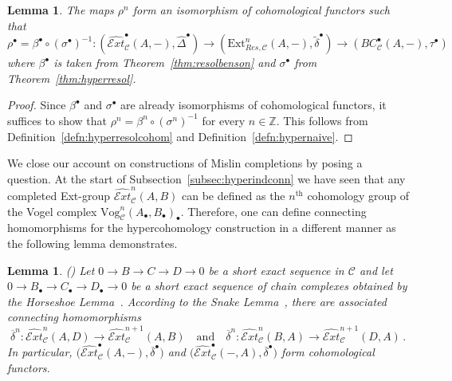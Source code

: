 \documentclass[12pt,a4paper]{article}
\numberwithin{equation}{section}
\newtheorem{lem}[thm]{Lemma}
\theoremstyle{nonumberplain}
\newtheorem{proof}{Proof}
\begin{document}
\begin{lem}\label{lem:hypernaive}
The maps $\rho^n$ form an isomorphism of cohomological functors such that
\[ \rho^{\bullet} = \beta^{\bullet} \circ (\sigma^{\bullet})^{-1}: (\widehat{\mathcal{E}xt}_{\mathcal{C}}^{\bullet}(A, -), \widehat{\Delta}^{\bullet}) \rightarrow (\mathrm{Ext}_{Res, \mathcal{C}}^n(A, -), \widetilde{\delta}^{\bullet}) \rightarrow (BC_{\mathcal{C}}^{\bullet}(A, -), \tau^{\bullet}) \]
where $\beta^{\bullet}$ is taken from Theorem~\ref{thm:resolbenson} and $\sigma^{\bullet}$ from Theorem~\ref{thm:hyperresol}.
\end{lem}

\begin{proof}
Since $\beta^{\bullet}$ and $\sigma^{\bullet}$ are already isomorphisms of cohomological functors, it suffices to show that $\rho^n = \beta^n \circ (\sigma^{n})^{-1}$ for every $n \in \mathbb{Z}$. This follows from Definition~\ref{defn:hyperresolcohom} and Definition~\ref{defn:hypernaive}.
\end{proof}

We close our account on constructions of Mislin completions by posing a question. At the start of Subsection~\ref{subsec:hyperindconn} we have seen that any completed Ext-group $\widehat{\mathcal{E}xt}_{\mathcal{C}}^n(A, B)$ can be defined as the $n^{\text{th}}$ cohomology group of the Vogel complex $\mathrm{Vog}_{\mathcal{C}}^n(A_{\bullet}, B_{\bullet})_{\bullet}$. Therefore, one can define connecting homomorphisms for the hypercohomology construction in a different manner as the following lemma demonstrates.

\begin{lem}
(\cite[Proposition~4.8]{guo23}) Let $0 \rightarrow B \rightarrow C \rightarrow D \rightarrow 0$ be a short exact sequence in $\mathcal{C}$ and let $0 \rightarrow B_{\bullet} \rightarrow C_{\bullet} \rightarrow D_{\bullet} \rightarrow 0$ be a short exact sequence of chain complexes obtained by the Horseshoe Lemma~\cite[p.~37]{wei94}. According to the Snake Lemma~\cite[p.~11--12]{wei94}, there are associated connecting homomorphisms
\[ \overline{\delta}^n: \widehat{\mathcal{E}xt}_{\mathcal{C}}^n(A, D) \rightarrow \widehat{\mathcal{E}xt}_{\mathcal{C}}^{n+1}(A, B) \quad \text{and} \quad \overline{\delta}^n: \widehat{\mathcal{E}xt}_{\mathcal{C}}^n(B, A) \rightarrow \widehat{\mathcal{E}xt}_{\mathcal{C}}^{n+1}(D, A) \, . \]
In particular, $\big(\widehat{\mathcal{E}xt}_{\mathcal{C}}^{\bullet}(A, -), \overline{\delta}^{\bullet}\big)$ and $\big(\widehat{\mathcal{E}xt}_{\mathcal{C}}^{\bullet}(-, A), \overline{\delta}^{\bullet}\big)$ form cohomological functors.
\end{lem}
\end{document}
